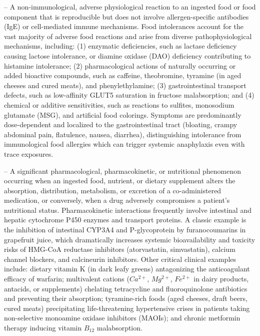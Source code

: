 -- A non-immunological, adverse physiological reaction to an ingested food or food component that is reproducible but does not involve allergen-specific antibodies (IgE) or cell-mediated immune mechanisms. Food intolerances account for the vast majority of adverse food reactions and arise from diverse pathophysiological mechanisms, including: (1) enzymatic deficiencies, such as lactase deficiency causing lactose intolerance, or diamine oxidase (DAO) deficiency contributing to histamine intolerance; (2) pharmacological actions of naturally occurring or added bioactive compounds, such as caffeine, theobromine, tyramine (in aged cheeses and cured meats), and phenylethylamine; (3) gastrointestinal transport defects, such as low-affinity GLUT5 saturation in fructose malabsorption; and (4) chemical or additive sensitivities, such as reactions to sulfites, monosodium glutamate (MSG), and artificial food colorings. Symptoms are predominantly dose-dependent and localized to the gastrointestinal tract (bloating, crampy abdominal pain, flatulence, nausea, diarrhea), distinguishing intolerance from immunological food allergies which can trigger systemic anaphylaxis even with trace exposures.

-- A significant pharmacological, pharmacokinetic, or nutritional phenomenon occurring when an ingested food, nutrient, or dietary supplement alters the absorption, distribution, metabolism, or excretion of a co-administered medication, or conversely, when a drug adversely compromises a patient's nutritional status. Pharmacokinetic interactions frequently involve intestinal and hepatic cytochrome P450 enzymes and transport proteins. A classic example is the inhibition of intestinal CYP3A4 and P-glycoprotein by furanocoumarins in grapefruit juice, which dramatically increases systemic bioavailability and toxicity risks of HMG-CoA reductase inhibitors (atorvastatin, simvastatin), calcium channel blockers, and calcineurin inhibitors. Other critical clinical examples include: dietary vitamin K (in dark leafy greens) antagonizing the anticoagulant efficacy of warfarin; multivalent cations ($Ca^{2+}$, $Mg^{2+}$, $Fe^{2+}$ in dairy products, antacids, or supplements) chelating tetracycline and fluoroquinolone antibiotics and preventing their absorption; tyramine-rich foods (aged cheeses, draft beers, cured meats) precipitating life-threatening hypertensive crises in patients taking non-selective monoamine oxidase inhibitors (MAOIs); and chronic metformin therapy inducing vitamin $B_{12}$ malabsorption.

